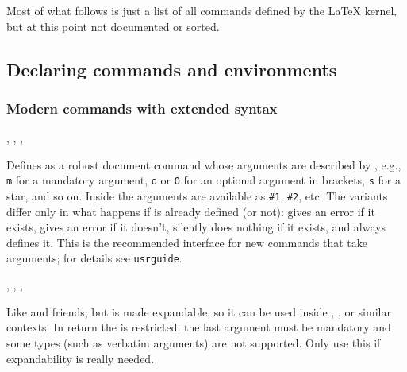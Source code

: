 \documentclass{l3in2edoc}
\begin{document}

Most of what follows is just a list of all commands defined by
the \LaTeX{} kernel, but at this point not documented or sorted.



\subsection{Declaring commands and environments}


\subsubsection{Modern commands with extended syntax}

\begin{function}[user]
  {
    \NewDocumentCommand,
    \RenewDocumentCommand,
    \DeclareDocumentCommand,
    \ProvideDocumentCommand
  }
  \begin{syntax}
       
  \end{syntax}
  Defines  as a robust document command whose arguments are
  described by , e.g., \texttt{m} for a mandatory
  argument, \texttt{o} or \texttt{O} for an optional
  argument in brackets, \texttt{s} for a star, and so on. Inside
   the arguments are available as \texttt{\#1},
  \texttt{\#2}, etc. The variants differ only in what happens if
   is already defined (or not): 
  gives an error if it exists,  gives an
  error if it doesn't,  silently does
  nothing if it exists, and  always
  defines it.
  This is the recommended interface for new commands that take
  arguments; for details see \texttt{usrguide}.
\end{function}




\begin{function}[user]
  {
    \NewExpandableDocumentCommand,
    \RenewExpandableDocumentCommand,
    \DeclareExpandableDocumentCommand,
    \ProvideExpandableDocumentCommand
  }
  \begin{syntax}
       
  \end{syntax}
  Like  and friends, but  is made
  expandable, so it can be used inside , , or
  similar contexts. In return the  is restricted: the
  last argument must be mandatory and some types (such as
  verbatim arguments) are not supported. Only use this if expandability
  is really needed.
\end{function}
\end{document}
